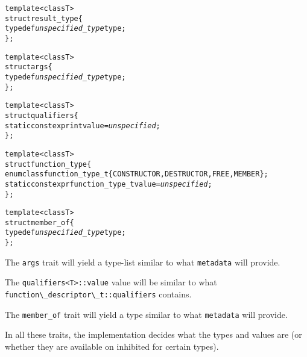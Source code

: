 \begin{alltt}
  template <class T>
  struct result\_type \{
    typedef \emph{unspecified\_type} type;
  \};
  
  template <class T>
  struct args \{
    typedef \emph{unspecified\_type} type;
  \};
  
  template <class T>
  struct qualifiers \{
    static constexpr int value = \emph{unspecified};
  \};
  
  template <class T>
  struct function\_type \{
    enum class function\_type\_t \{ CONSTRUCTOR, DESTRUCTOR, FREE, MEMBER \};
    static constexpr function_type_t value = \emph{unspecified};
  \};
  
  template <class T>
  struct member_of \{
    typedef \emph{unspecified\_type} type;
  \};
\end{alltt}

The \verb+args+ trait will yield a type-list similar to what \verb+metadata+ will provide.

The \verb+qualifiers<T>::value+ value will be similar to what \verb+function\_descriptor\_t::qualifiers+ contains.

The \verb+member_of+ trait will yield a type similar to what \verb+metadata+ will provide.

In all these traits, the implementation decides what the types and values are (or whether they are available on inhibited for certain types).